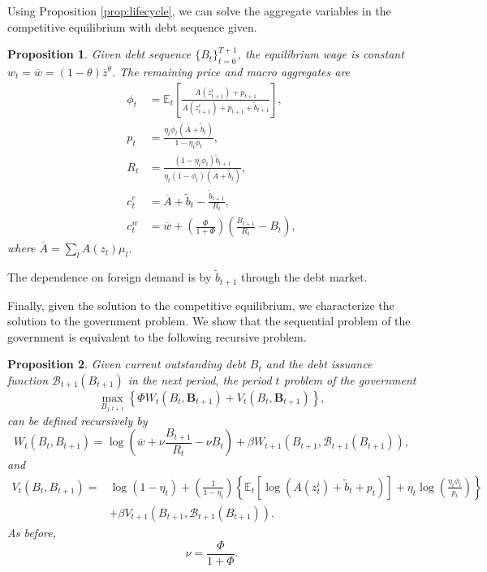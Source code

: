 \documentclass[twoside,11pt,leqno]{article}
\newcommand{\E}{\mathbb{E}}
\renewcommand{\vec}[1]{\ensuremath{\mathbf{#1}}}
\newtheorem{proposition}{Proposition}
\begin{document}
Using Proposition \ref{prop:lifecycle}, we can solve the aggregate variables in the competitive equilibrium with debt sequence given.
\begin{proposition}
\label{prop:competitive}
Given debt sequence $\{{B}_{t}\}_{t=0}^{T+1}$, the equilibrium wage is constant $w_{t} = \overline{w} = (1-\theta)\overline{z}^{\theta}$. The remaining price and macro aggregates are
\begin{align*}
    \phi_t &= \E_t\left[\frac{A(z^i_{t+1})+p_{t+1}}{A(z^i_{t+1})+p_{t+1}+\tilde{b}_{t+1}} \right], \\
    p_t    &= \frac{\eta_t\phi_t(\overline{A}+\tilde{b}_t)}{1-\eta_t\phi_t}, \\
    R_t    &= \frac{(1-\eta_t\phi_t)\tilde{b}_{t+1}}{\eta_t(1-\phi_t)(\overline{A}+\tilde{b}_t)}, \\
    c^e_t  &= \overline{A}+\tilde{b}_t-\frac{\tilde{b}_{t+1}}{R_t}, \\
    c^w_t  &= \overline{w} + \left(\frac{\Phi}{1+\Phi} \right)\left(\frac{B_{t+1}}{R_t}-B_t \right),
\end{align*}
where $\overline{A} = \sum_l A(z_l)\mu_l$.
\end{proposition}
The dependence on foreign demand is by $\tilde{b}_{t+1}$ through the debt market.

Finally, given the solution to the competitive equilibrium, we characterize the solution to the government problem. We show that the sequential problem of the government is equivalent to the following recursive problem.
\begin{proposition}
Given current outstanding debt $B_t$ and the debt issuance function $\mathcal{B}_{t+1}({B}_{t+1})$ in the next period, the period $t$ problem of the government
\begin{equation}
    \max_{B_{j,t+1}}\left\{\Phi W_{t}({B}_t,\vec{B}_{t+1}) + V_{t}({B}_t,\vec{B}_{t+1}) \right\},
\end{equation}
can be defined recursively by
\begin{equation}
    W_{t}({B}_t,B_{t+1}) = \log \left(\overline{w} +\nu\frac{B_{t+1}}{R_{t}} - \nu B_{t} \right)+\beta W_{t+1}({B}_{t+1},\mathcal{B}_{t+1}({B}_{t+1})),
\end{equation}
and
\begin{align}
    V_{t}({B}_t,{B}_{t+1}) = &\log (1-\eta_t) + \left(\frac{1}{1-\eta_t} \right)\left\{\E_t[\log (A(z^i_{t}) + \tilde{b}_t + p_{t})] + \eta_t\log \left(\frac{\eta_{t}\phi_{t}}{p_{t}} \right) \right\} \nonumber \\
        & +\beta V_{t+1}({B}_{t+1},\mathcal{B}_{t+1}({B}_{t+1})).
\end{align}
As before,
\begin{equation*}
    \nu = \frac{\Phi}{1+\Phi}.
\end{equation*}
\end{proposition}
\end{document}
